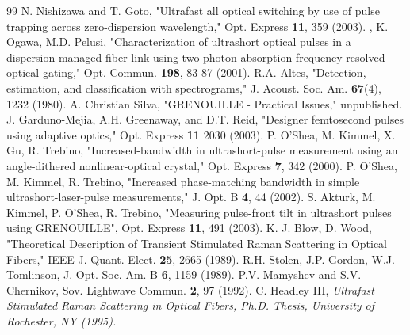 \begin{thebibliography}{99}
 N. Nishizawa and T. Goto, "Ultrafast all optical switching by use of pulse trapping across zero-dispersion wavelength," Opt. Express \textbf{11}, 359 (2003).
, K. Ogawa, M.D. Pelusi, "Characterization of ultrashort optical pulses in a dispersion-managed fiber link using two-photon absorption frequency-resolved optical gating," Opt. Commun. \textbf{198}, 83-87 (2001).
 R.A. Altes, "Detection, estimation, and classification
with spectrograms," J. Acoust. Soc. Am. \textbf{67}(4), 1232 (1980).
 A. Christian Silva, "GRENOUILLE - Practical Issues," unpublished.
 J. Garduno-Mejia, A.H. Greenaway, and D.T. Reid, "Designer
femtosecond pulses using adaptive optics," Opt. Express \textbf{11}
2030 (2003).
 P. O'Shea, M. Kimmel, X. Gu, R. Trebino, "Increased-bandwidth in ultrashort-pulse measurement using an angle-dithered nonlinear-optical crystal," Opt. Express \textbf{7}, 342 (2000).
 P. O'Shea, M. Kimmel, R. Trebino, "Increased phase-matching bandwidth in simple ultrashort-laser-pulse measurements," J. Opt. B \textbf{4}, 44 (2002).
 S. Akturk, M. Kimmel, P. O'Shea, R. Trebino, "Measuring pulse-front tilt in ultrashort pulses using GRENOUILLE", Opt. Express \textbf{11}, 491 (2003).
 K. J. Blow, D. Wood, "Theoretical Description of Transient Stimulated Raman Scattering in Optical Fibers," IEEE J. Quant. Elect. \textbf{25}, 2665 (1989).
 R.H. Stolen, J.P. Gordon, W.J. Tomlinson,
J. Opt. Soc. Am. B \textbf{6}, 1159 (1989).
 P.V. Mamyshev and S.V. Chernikov, Sov. Lightwave
Commun. \textbf{2}, 97 (1992).
 C. Headley III, \em{Ultrafast Stimulated Raman
Scattering in Optical Fibers}, Ph.D. Thesis, University of Rochester,
NY (1995).
\end{thebibliography}
